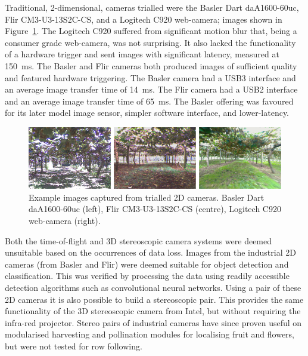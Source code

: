 \documentclass[preprint,authoryear,12pt]{elsarticle}
\begin{document}
        Traditional, 2-dimensional, cameras trialled were the Basler Dart daA1600-60uc, Flir CM3-U3-13S2C-CS, and a Logitech C920 web-camera; images shown in Figure~\ref{fig:cameraComparison}.
        The Logitech C920 suffered from significant motion blur that, being a consumer grade web-camera, was not surprising.
        It also lacked the functionality of a hardware trigger and sent images with significant latency, measured at \SI{150}{\milli\second}.
        The Basler and Flir cameras both produced images of sufficient quality and featured hardware triggering.
        The Basler camera had a USB3 interface and an average image transfer time of \SI{14}{\milli\second}.
        The Flir camera had a USB2 interface and an average image transfer time of \SI{65}{\milli\second}.
        The Basler offering was favoured for its later model image sensor, simpler software interface, and lower-latency.

        \begin{figure}[htb]
            \centering
            \includegraphics[width=\linewidth]{imgs/camera_comparison/camera_comparison.pdf}
            \caption{
                Example images captured from trialled 2D cameras.
                Basler Dart daA1600-60uc (left), Flir CM3-U3-13S2C-CS (centre), Logitech C920 web-camera (right).
            }
            \label{fig:cameraComparison}
        \end{figure}

        Both the time-of-flight and 3D stereoscopic camera systems were deemed unsuitable based on the occurrences of data loss.
        Images from the industrial 2D cameras (from Basler and Flir) were deemed suitable for object detection and classification.
        This was verified by processing the data using readily accessible detection algorithms such as convolutional neural networks.
        Using a pair of these 2D cameras it is also possible to build a stereoscopic pair.
        This provides the same functionality of the 3D stereoscopic camera from Intel, but without requiring the infra-red projector.
        Stereo pairs of industrial cameras have since proven useful on modularised harvesting and pollination modules for localising fruit and flowers, but were not tested for row following.
\end{document}

